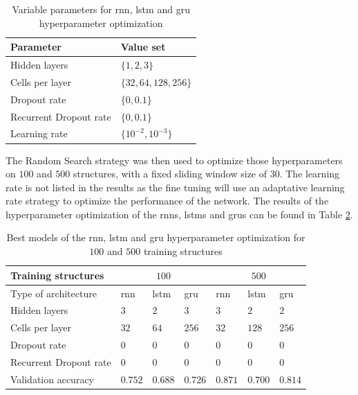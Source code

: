 \documentclass[conference]{IEEEtran}
\begin{document}
\begin{table}[htp]
	\centering
	\caption{Variable parameters for \gls{rnn}, \gls{lstm} and \gls{gru} hyperparameter optimization}
	\label{tab:variable_parameters_rnn_optimization}
	\begin{tabular}{ll}
		\textbf{Parameter} & \textbf{Value set} \\
		\hline
		Hidden layers & $ \{1, 2, 3\} $ \\
		Cells per layer & $ \{32, 64, 128, 256\} $ \\
		Dropout rate & $ \{0, 0.1\} $ \\
		Recurrent Dropout rate & $ \{0, 0.1\} $ \\
		Learning rate & $ \{10^{-2}, 10^{-3}\} $
	\end{tabular}
\end{table}

The Random Search strategy was then used to optimize those hyperparameters on $ 100 $ and $ 500 $ structures, with a fixed sliding window size of $ 30 $. The learning rate is not listed in the results as the fine tuning will use an adaptative learning rate strategy to optimize the performance of the network. The results of the hyperparameter optimization of the \glspl{rnn}, \glspl{lstm} and \glspl{gru} can be found in Table \ref{tab:results_parameters_rnn_optimization}.

\begin{table}[htp]
	\centering
	\caption{Best models of the \gls{rnn}, \gls{lstm} and \gls{gru} hyperparameter optimization for $ 100 $ and $ 500 $ training structures}
	\label{tab:results_parameters_rnn_optimization}
	\setlength{\tabcolsep}{3pt} %
	\begin{tabular}{p{2.5cm}|lll|lll}
		Training structures & \multicolumn{3}{c}{$ 100 $} & \multicolumn{3}{c}{$ 500 $} \\
		\hline
		Type of architecture & \gls{rnn} & \gls{lstm} & \gls{gru} & \gls{rnn} & \gls{lstm} & \gls{gru}\\
		\hline
		Hidden layers & $3$ & $2$ & $3$ & $3$ & $2$ & $2$ \\
		Cells per layer & $32$ & $64$ & $256$ & $32$ & $128$ & $256$ \\
		Dropout rate & $0$ & $0$ & $0$ & $0$ & $0$ & $0$ \\
		Recurrent Dropout rate & $0$ & $0$ & $0$& $0$ & $0$ & $0$ \\
		\hline
		Validation accuracy & $0.752$ & $0.688$ & $0.726$ & $0.871$ & $0.700$ & $0.814$
	\end{tabular}
\end{table}
\end{document}
